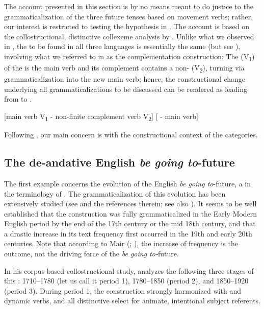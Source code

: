 \documentclass[output=paper]{langsci/langscibook}
\begin{document}
The account presented in this section is by no means meant to do justice to the grammaticalization of the three  future tenses based on movement verbs; rather, our interest is restricted to testing the hypothesis in . The account is based on the collostructional, distinctive collexeme analysis by \citet{Hilpert2008}. Unlike what we observed in , the  to be found in all three languages is essentially the same (but see ), involving what we referred to in  as the complementation construction: The  (V\textsubscript{1}) of the  is the main verb and its complement contains a non- (V\textsubscript{2}), turning via grammaticalization into the new main verb; hence, the constructional change underlying all grammaticalizations to be discussed can be rendered as leading from  to . 

\ea \label{ex:heine:10}
\ea \label{ex:heine:10a} {[main verb V\textsubscript{1}        -    non-finite complement verb V\textsubscript{2}]}
\ex \label{ex:heine:10b}  {[   -    main verb]}
\z
\z 

Following \citet{Hilpert2008}, our main concern is with the constructional context of the  categories.

\subsection{The de-andative English \emph{be going to}-future}\label{sec:heine:3.1}

The first example concerns the evolution of the English \textit{be going to}-future, a  in the terminology of \citet{Dahl2000}. The grammaticalization of this evolution has been extensively studied (see \citealt{Hopper2003,Mair2004,Hilpert2008} and the references therein; see also \citealt{Disney2009}). It seems to be well established that the construction was fully grammaticalized in the Early Modern English period by the end of the 17th century or the mid 18th century, and that a drastic increase in its text frequency first occurred in the 19th and early 20th centuries. Note that according to Mair (\citeyear[129]{Mair2004}; \citeyear[244--245]{Mair2011}), the increase of frequency is the outcome, not the driving force of the \textit{be going to-}future.


In his corpus-based collostructional study, \citet[118--121]{Hilpert2008} analyzes the following three stages of this : 1710--1780 (let us call it period 1), 1780--1850 (period 2), and 1850--1920 (period 3). During period 1, the construction strongly harmonized with  and dynamic verbs, and all distinctive  select for animate, intentional subject referents.
\end{document}
